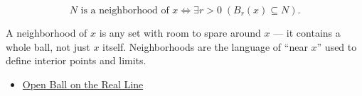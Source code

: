 \begin{remark*}
\[
N \text{ is a neighborhood of } x \Longleftrightarrow \exists r>0\;(B_{r}(x)\subseteq N).
\]
\end{remark*}
\begin{remark*}[Interpretation]
A neighborhood of $x$ is any set with room to spare around $x$ --- it contains a whole ball, not just $x$ itself. Neighborhoods are the language of ``near $x$'' used to define interior points and limits.
\end{remark*}
\begin{dependencies}
\begin{itemize}
  \item \hyperref[def:open-ball]{Open Ball on the Real Line}
\end{itemize}
\end{dependencies}
